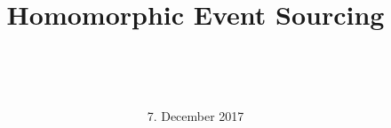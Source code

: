 \documentclass[utf8]{beamer}
\author{~}
\title{Homomorphic Event Sourcing}
\subtitle{~}
\institute{~}
\date{7. December 2017}
\begin{document}
{
	\usebackgroundtemplate{} %
	\begin{frame}[t,plain]
		\titlepage
	\end{frame}
}

\end{document}
